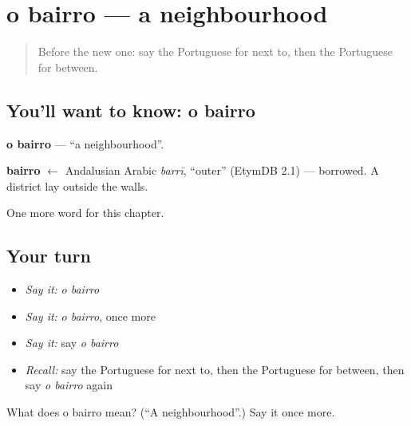 \section[o bairro]{o bairro — a neighbourhood}

\label{lesson:PT-C89-bairro}



\begin{quote}
Before the new one: say the Portuguese for next to, then the Portuguese for between.
\end{quote}

\subsection*{You'll want to know: o bairro}
\textbf{o bairro} — \textquotedblleft{}a neighbourhood\textquotedblright{}.

\begin{cousinweb}
\textbf{bairro} $\leftarrow$ Andalusian Arabic \emph{barrī}, \textquotedblleft{}outer\textquotedblright{} (EtymDB 2.1) — borrowed. A district lay outside the walls.
\end{cousinweb}

\begin{grammarlens}[title={What you've built}]
One more word for this chapter.
\end{grammarlens}

\subsection*{Your turn}
\begin{itemize}
\raggedright
  \item \emph{Say it:} \emph{o bairro}
  \item \emph{Say it:} \emph{o bairro}, once more
  \item \emph{Say it:} say \emph{o bairro}
  \item \emph{Recall:} say the Portuguese for next to, then the Portuguese for between, then say \emph{o bairro} again
\end{itemize}

\begin{tcolorbox}[breakable,colback=teal!4,colframe=teal!35!black,title={Before you move on}]
What does o bairro mean? (\textquotedblleft{}A neighbourhood\textquotedblright{}.) Say it once more.
\end{tcolorbox}
